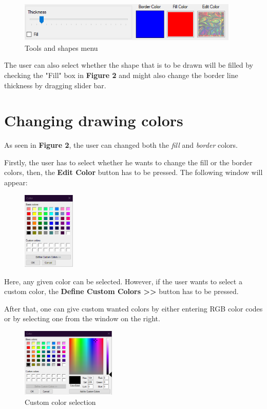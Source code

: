 \documentclass[12pt]{article}
\begin{document}
\begin{figure}[h]
\centering
\includegraphics[width=10.5cm]{graphics/thickness_fill_colors.png}
\caption{Tools and shapes menu}
\end{figure}

The user can also select whether the shape that is to be drawn will be filled by checking the "Fill" box in \textbf{Figure 2} and might also change the border line thickness by dragging slider bar.

\section*{Changing drawing colors}

As seen in \textbf{Figure 2}, the user can changed both the \textit{fill} and \textit{border} colors.  

Firstly, the user has to select whether he wants to change the fill or the border colors, then, the \textbf{Edit Color} button has to be pressed. The following window will appear:

\begin{figure}[h]
\centering
\includegraphics[width=2.5cm]{graphics/colors.png}
\end{figure}

Here, any given color can be selected. However, if the user wants to select a custom color, the \textbf{Define Custom Colors >>} button has to be pressed.

After that, one can give custom wanted colors by either entering RGB color codes or by selecting one from the window on the right.

\begin{figure}[h]
\centering
\includegraphics[width=4.5cm]{graphics/custom_colors.png}
\caption{Custom color selection}
\end{figure}
\end{document}
